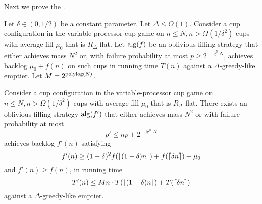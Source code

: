 Next we prove the .

\begin{lemma}
  \label{lem:obliviousAmplification} 
  Let $\delta \in (0, 1/2)$ be a constant parameter. Let $\Delta
  \le O(1)$. Consider a cup configuration
  in the variable-processor cup game on $n \le N, n >
  \Omega(1/\delta^2)$ cups with average fill $\mu_0$ that is
  $R_\Delta$-flat. Let $\operatorname{\text{\textup{alg}}}(f)$ be an oblivious filling strategy
  that either achieves mass $N^2$ or, with failure probability at
  most $p\ge 2^{-\lg^8 N}$, achieves backlog $\mu_0 + f(n)$ on such cups
  in running time $T(n)$ against a $\Delta$-greedy-like emptier.
  Let $M = 2^{\operatorname{\text{polylog}}(N)}$.

  Consider a cup configuration in the variable-processor cup game
  on $n \le N, n > \Omega(1/\delta^2)$ cups with average fill
  $\mu_0$ that is $R_\Delta$-flat. There exists an oblivious
  filling strategy $\operatorname{\text{\textup{alg}}}(f')$ that either achieves mass $N^2$ or
  with failure probability at most 
  $$p' \le np + 2^{-\lg^8 N}$$
  achieves backlog $f'(n)$ satisfying 
  $$f'(n) \ge (1-\delta)^2 f(\left\lfloor (1-\delta)n \right\rfloor) + f(\left\lceil \delta n \right\rceil) + \mu_0$$ 
  and $f'(n) \ge f(n)$, in running time 
  $$T'(n) \le Mn\cdot T(\left\lfloor (1-\delta)n \right\rfloor) + T(\left\lceil \delta n \right\rceil)$$
  against a $\Delta$-greedy-like emptier.
\end{lemma}

